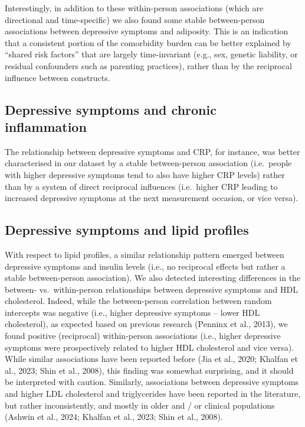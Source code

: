 \documentclass[
  letterpaper,
  DIV=11,
  numbers=noendperiod]{scrreport}
\begin{document}
Interestingly, in addition to these within-person associations (which
are directional and time-specific) we also found some stable
between-person associations between depressive symptoms and adiposity.
This is an indication that a consistent portion of the comorbidity
burden can be better explained by ``shared risk factors'' that are
largely time-invariant (e.g., sex, genetic liability, or residual
confounders such as parenting practices), rather than by the reciprocal
influence between constructs.

\subsection{Depressive symptoms and chronic
inflammation}\label{depressive-symptoms-and-chronic-inflammation}

The relationship between depressive symptoms and CRP, for instance, was
better characterised in our dataset by a stable between-person
association (i.e.~people with higher depressive symptoms tend to also
have higher CRP levels) rather than by a system of direct reciprocal
influences (i.e.~higher CRP leading to increased depressive symptoms at
the next measurement occasion, or vice versa).

\subsection{Depressive symptoms and lipid
profiles}\label{depressive-symptoms-and-lipid-profiles}

With respect to lipid profiles, a similar relationship pattern emerged
between depressive symptoms and insulin levels (i.e., no reciprocal
effects but rather a stable between-person association). We also
detected interesting differences in the between- vs.~within-person
relationships between depressive symptoms and HDL cholesterol. Indeed,
while the between-person correlation between random intercepts was
negative (i.e., higher depressive symptoms -- lower HDL cholesterol), as
expected based on previous research (Penninx et al., 2013), we found
positive (reciprocal) within-person associations (i.e., higher
depressive symptoms were prospectively related to higher HDL cholesterol
and vice versa). While similar associations have been reported before
(Jia et al., 2020; Khalfan et al., 2023; Shin et al., 2008), this
finding was somewhat surprising, and it should be interpreted with
caution. Similarly, associations between depressive symptoms and higher
LDL cholesterol and triglycerides have been reported in the literature,
but rather inconsistently, and mostly in older and / or clinical
populations (Ashwin et al., 2024; Khalfan et al., 2023; Shin et al.,
2008).
\end{document}
